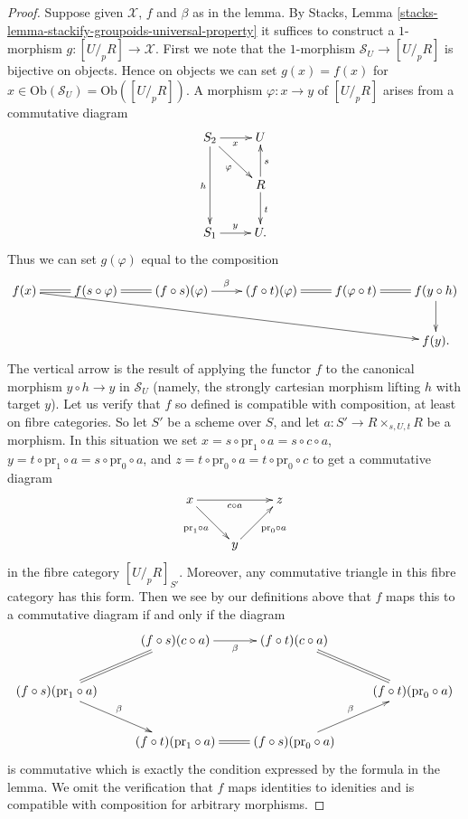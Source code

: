 \begin{proof}
Suppose given $\mathcal{X}$, $f$ and $\beta$ as in the lemma. By
Stacks, Lemma \ref{stacks-lemma-stackify-groupoids-universal-property}
it suffices to construct a $1$-morphism $g : [U/_{\!p}R] \to \mathcal{X}$.
First we note that the $1$-morphism
$\mathcal{S}_U \to [U/_{\!p}R]$ is bijective on objects.
Hence on objects we can set $g(x) = f(x)$ for
$x \in \text{Ob}(\mathcal{S}_U) = \text{Ob}([U/_{\!p}R])$.
A morphism $\varphi : x \to y$ of $[U/_{\!p}R]$ arises from a
commutative diagram
$$
\xymatrix{
S_2 \ar[dd]_h \ar[r]_x \ar[dr]_\varphi & U \\
& R \ar[u]_s \ar[d]^t \\
S_1 \ar[r]^y & U.
}
$$
Thus we can set $g(\varphi)$ equal to the composition
$$
\xymatrix{
f(x) \ar@{=}[r] \ar[rrrrrd] &
f(s \circ \varphi) \ar@{=}[r] &
(f \circ s)(\varphi) \ar[r]^\beta &
(f \circ t)(\varphi) \ar@{=}[r] &
f(\varphi \circ t) \ar@{=}[r] &
f(y \circ h) \ar[d] \\
& & & & & f(y).
}
$$
The vertical arrow is the result of applying the functor $f$ to the
canonical morphism $y \circ h \to y$ in $\mathcal{S}_U$ (namely, the
strongly cartesian morphism lifting $h$ with target $y$).
Let us verify that $f$ so defined is compatible with composition, at least
on fibre categories. So let $S'$ be a scheme over $S$, and let
$a : S' \to R \times_{s, U, t} R$ be a morphism. In this situation
we set $x = s \circ \text{pr}_1 \circ a = s \circ c \circ a$,
$y = t \circ \text{pr}_1 \circ a = s \circ \text{pr}_0 \circ a$, and
$z = t \circ \text{pr}_0 \circ a = t \circ \text{pr}_0 \circ c$ to
get a commutative diagram
$$
\xymatrix{
x \ar[rr]_{c \circ a} \ar[rd]_{\text{pr}_1 \circ a} & & z \\
& y \ar[ru]_{\text{pr}_0 \circ a}
}
$$
in the fibre category $[U/_{\!p}R]_{S'}$. Moreover, any commutative
triangle in this fibre category has this form. Then we see by our definitions
above that $f$ maps this to a commutative diagram if and only if
the diagram
$$
\xymatrix{
& (f \circ s)(c \circ a) \ar[r]_-{\beta} &
(f \circ t)(c \circ a) \ar@{=}[rd] & \\
(f \circ s)(\text{pr}_1 \circ a) \ar[rd]^\beta \ar@{=}[ru] & & &
(f \circ t)(\text{pr}_0 \circ a) \\
& (f \circ t)(\text{pr}_1 \circ a) \ar@{=}[r] &
(f \circ s)(\text{pr}_0 \circ a) \ar[ru]^\beta
}
$$
is commutative which is exactly the condition expressed by the formula
in the lemma. We omit the
verification that $f$ maps identities to idenities and is compatible
with composition for arbitrary morphisms.
\end{proof}












